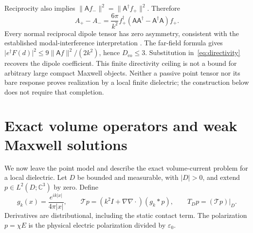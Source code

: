 \documentclass[11pt,a4paper]{article}
\theoremstyle{remark}
\newcommand{\norm}[1]{\lVert #1\rVert}
\newcommand{\abs}[1]{\lvert #1\rvert}
\begin{document}
Reciprocity also implies $\norm{\mathsf A f_-}^2=\norm{\mathsf A^\dagger f_+}^2$. Therefore
\begin{equation}\label{eq:nonnormal}
 A_+-A_-=\frac{6\pi}{k^2}f_+^\dagger
 (\mathsf A\mathsf A^\dagger-\mathsf A^\dagger\mathsf A)f_+.
\end{equation}
Every normal reciprocal dipole tensor has zero asymmetry, consistent with the established modal-interference interpretation \citep{Hopkins2015}. The far-field formula gives $\abs{e^\dagger F(d)}^2\leq9\norm{\mathsf A f}^2/(2k^2)$, hence $D_{\mathrm{co}}\leq3$. Substitution in~\eqref{eq:directivity} recovers the dipole coefficient. This finite directivity ceiling is not a bound for arbitrary large compact Maxwell objects. Neither a passive point tensor nor its bare response proves realization by a local finite dielectric; the construction below does not require that completion.

\section{Exact volume operators and weak Maxwell solutions}\label{sec:volume}
We now leave the point model and describe the exact volume-current problem for a local dielectric. Let $D$ be bounded and measurable, with $\abs D>0$, and extend $p\in L^2(D;\mathbb C^3)$ by zero. Define
\begin{equation}\label{eq:Green}
 g_k(x)=\frac{e^{ik\abs x}}{4\pi\abs x},\qquad
 \mathcal Tp=(k^2I+\nabla\nabla\cdot)(g_k*p),\qquad
 T_Dp=(\mathcal Tp)|_D.
\end{equation}
Derivatives are distributional, including the static contact term. The polarization $p=\chi E$ is the physical electric polarization divided by $\varepsilon_0$.
\end{document}
